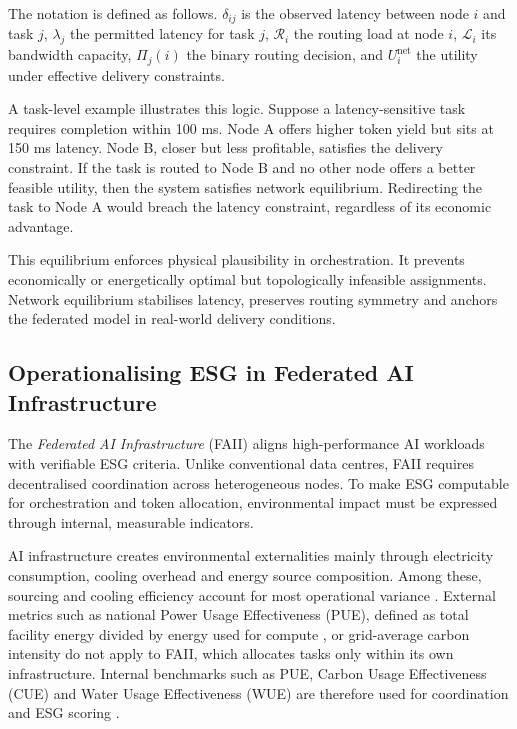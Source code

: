 \documentclass[oneside,10pt]{swissi}
\begin{document}
The notation is defined as follows. \( \delta_{ij} \) is the observed latency between node \( i \) and task \( j \), \( \lambda_j \) the permitted latency for task \( j \), \( \mathcal{R}_i \) the routing load at node \( i \), \( \mathcal{L}_i \) its bandwidth capacity, \( \Pi_j(i) \) the binary routing decision, and \( U_i^{\text{net}} \) the utility under effective delivery constraints.

A task-level example illustrates this logic. Suppose a latency-sensitive task requires completion within 100 ms. Node A offers higher token yield but sits at 150 ms latency. Node B, closer but less profitable, satisfies the delivery constraint. If the task is routed to Node B and no other node offers a better feasible utility, then the system satisfies network equilibrium. Redirecting the task to Node A would breach the latency constraint, regardless of its economic advantage.

This equilibrium enforces physical plausibility in orchestration. It prevents economically or energetically optimal but topologically infeasible assignments. Network equilibrium stabilises latency, preserves routing symmetry and anchors the federated model in real-world delivery conditions.\\

\subsection{Operationalising ESG in Federated AI Infrastructure}

The \textit{Federated AI Infrastructure} (FAII) aligns high-performance AI workloads with verifiable ESG criteria. Unlike conventional data centres, FAII requires decentralised coordination across heterogeneous nodes. To make ESG computable for orchestration and token allocation, environmental impact must be expressed through internal, measurable indicators.

AI infrastructure creates environmental externalities mainly through electricity consumption, cooling overhead and energy source composition. Among these, sourcing and cooling efficiency account for most operational variance \cite{cao2021}. External metrics such as national Power Usage Effectiveness (PUE), defined as total facility energy divided by energy used for compute \cite{hanstein2015}, or grid-average carbon intensity do not apply to FAII, which allocates tasks only within its own infrastructure. Internal benchmarks such as PUE, Carbon Usage Effectiveness (CUE) and Water Usage Effectiveness (WUE) are therefore used for coordination and ESG scoring \cite{komprise2023,vertiv2023}.
\end{document}
